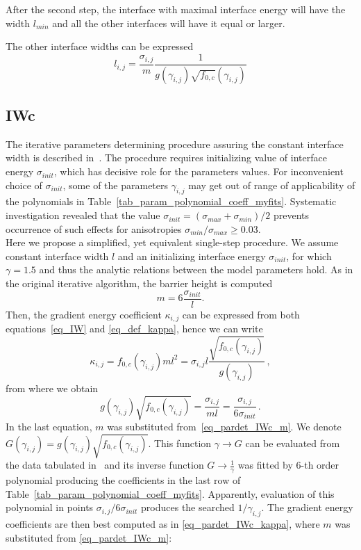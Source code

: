 After the second step, the interface with maximal interface energy will have the width $l_{min}$ and all the other interfaces will have it equal or larger.

The other interface widths can be expressed
\begin{equation}
	l_{i,j} = \frac{\sigma_{i,j}}{m}\frac{1}{g(\gamma_{i,j})\sqrt{f_{0,c}}(\gamma_{i,j})}
\end{equation}

\subsection{IWc}
The iterative parameters determining procedure assuring the constant interface width is described in~\cite{Moelans2008}. The procedure requires initializing value of interface energy $\sigma_{init}$, which has decisive role for the parameters values. For inconvenient choice of $\sigma_{init}$, some of the parameters $\gamma_{i,j}$ may get out of range of applicability of the polynomials in Table~\ref{tab_param_polynomial_coeff_myfits}. Systematic investigation revealed that the value $\sigma_{init}=(\sigma_{max}+\sigma_{min})/2$ prevents occurrence of such effects for anisotropies $\sigma_{min}/\sigma_{max}\geq 0.03$. \\
Here we propose a simplified, yet equivalent single-step procedure. We assume constant interface width $l$ and an initializing interface energy $\sigma_{init}$, for which $\gamma=1.5$ and thus the analytic relations between the model parameters hold. As in the original iterative algorithm, the barrier height is computed
\begin{equation} \label{eq_pardet_IWc_m}
	m = 6\frac{\sigma_{init}}{l} .
\end{equation}
Then, the gradient energy coefficient $\kappa_{i,j}$ can be expressed from both equations~\eqref{eq_IW} and \eqref{eq_def_kappa}, hence we can write
\begin{equation} \label{eq_pardet_IWc_kappa}
	\kappa_{i,j}=f_{0,c}(\gamma_{i,j})ml^2 = \sigma_{i,j}l\frac{\sqrt{f_{0,c}(\gamma_{i,j})}}{g(\gamma_{i,j})} \,,
\end{equation}
from where we obtain
\begin{equation}
	g(\gamma_{i,j})\sqrt{f_{0,c}(\gamma_{i,j})}=\frac{\sigma_{i,j}}{ml} = \frac{\sigma_{i,j}}{6\sigma_{init}} \,.
\end{equation}
In the last equation, $m$ was substituted from~\eqref{eq_pardet_IWc_m}. We denote $G(\gamma_{i,j})=g(\gamma_{i,j})\sqrt{f_{0,c}(\gamma_{i,j})}$. This function $\gamma\rightarrow G$ can be evaluated from the data tabulated in~\cite{Ravash2017} and its inverse function $G \rightarrow \frac{1}{\gamma}$ was fitted by 6-th order polynomial producing the coefficients in the last row of Table~\ref{tab_param_polynomial_coeff_myfits}. Apparently, evaluation of this polynomial in points $\sigma_{i,j}/6\sigma_{init}$ produces the searched $1/\gamma_{i,j}$. The gradient energy coefficients are then best computed as in \ref{eq_pardet_IWc_kappa}, where $m$ was substituted from \ref{eq_pardet_IWc_m}:
